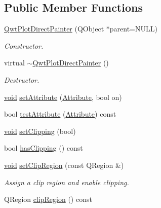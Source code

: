 \subsection*{Public Member Functions}
\begin{DoxyCompactItemize}
\item 
\hyperlink{class_qwt_plot_direct_painter_af9e6e2056afd4db4c081e4b04d5c9a85}{Qwt\-Plot\-Direct\-Painter} (Q\-Object $\ast$parent=N\-U\-L\-L)
\begin{DoxyCompactList}\small\item\em Constructor. \end{DoxyCompactList}\item 
virtual \hyperlink{class_qwt_plot_direct_painter_aab96bfd08e9041c2552210bbd3ee5ad0}{$\sim$\-Qwt\-Plot\-Direct\-Painter} ()
\begin{DoxyCompactList}\small\item\em Destructor. \end{DoxyCompactList}\item 
\hyperlink{group___u_a_v_objects_plugin_ga444cf2ff3f0ecbe028adce838d373f5c}{void} \hyperlink{class_qwt_plot_direct_painter_a498b9857a09e399010a3f8bc9c235a8d}{set\-Attribute} (\hyperlink{class_qwt_plot_direct_painter_a38f72175526a1a748d311763707cf934}{Attribute}, bool on)
\item 
bool \hyperlink{class_qwt_plot_direct_painter_ad48b7706cbba44f91fb9f770e10bcc93}{test\-Attribute} (\hyperlink{class_qwt_plot_direct_painter_a38f72175526a1a748d311763707cf934}{Attribute}) const 
\item 
\hyperlink{group___u_a_v_objects_plugin_ga444cf2ff3f0ecbe028adce838d373f5c}{void} \hyperlink{class_qwt_plot_direct_painter_ac3d406aada74b7d9202c1017d8347708}{set\-Clipping} (bool)
\item 
bool \hyperlink{class_qwt_plot_direct_painter_a8d6b8b273b4e74181cd7ed5fdaf0bb7e}{has\-Clipping} () const 
\item 
\hyperlink{group___u_a_v_objects_plugin_ga444cf2ff3f0ecbe028adce838d373f5c}{void} \hyperlink{class_qwt_plot_direct_painter_a0c97174b06957f9b20ea295ff403a557}{set\-Clip\-Region} (const Q\-Region \&)
\begin{DoxyCompactList}\small\item\em Assign a clip region and enable clipping. \end{DoxyCompactList}\item 
Q\-Region \hyperlink{class_qwt_plot_direct_painter_a62f4330f5be1386ef69ed5754aa16678}{clip\-Region} () const 
\item 

\end{DoxyCompactItemize}
